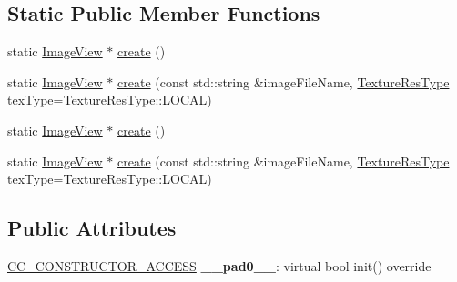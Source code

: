 \subsection*{Static Public Member Functions}
\begin{DoxyCompactItemize}
\item 
static \hyperlink{classui_1_1ImageView}{Image\+View} $\ast$ \hyperlink{classui_1_1ImageView_aa041d4f6eb4dd034fce0062344ed5957}{create} ()
\item 
static \hyperlink{classui_1_1ImageView}{Image\+View} $\ast$ \hyperlink{classui_1_1ImageView_a23ce1799f9fd1f2346ac96f32764f639}{create} (const std\+::string \&image\+File\+Name, \hyperlink{classui_1_1Widget_a040a65ec5ad3b11119b7e16b98bd9af0}{Texture\+Res\+Type} tex\+Type=Texture\+Res\+Type\+::\+L\+O\+C\+AL)
\item 
static \hyperlink{classui_1_1ImageView}{Image\+View} $\ast$ \hyperlink{classui_1_1ImageView_a492e6b3f4897f31dfbe7dec0630a3570}{create} ()
\item 
static \hyperlink{classui_1_1ImageView}{Image\+View} $\ast$ \hyperlink{classui_1_1ImageView_ae59e0212595985a4c0304020144e0c24}{create} (const std\+::string \&image\+File\+Name, \hyperlink{classui_1_1Widget_a040a65ec5ad3b11119b7e16b98bd9af0}{Texture\+Res\+Type} tex\+Type=Texture\+Res\+Type\+::\+L\+O\+C\+AL)
\end{DoxyCompactItemize}
\subsection*{Public Attributes}
\begin{DoxyCompactItemize}
\item 
\mbox{\label{classui_1_1ImageView_a6203e5dae2fa9ea300f96b3288550292}} 
\hyperlink{_2cocos2d_2cocos_2base_2ccConfig_8h_a25ef1314f97c35a2ed3d029b0ead6da0}{C\+C\+\_\+\+C\+O\+N\+S\+T\+R\+U\+C\+T\+O\+R\+\_\+\+A\+C\+C\+E\+SS} {\bfseries \+\_\+\+\_\+pad0\+\_\+\+\_\+}\+: virtual bool init() override
\end{DoxyCompactItemize}
